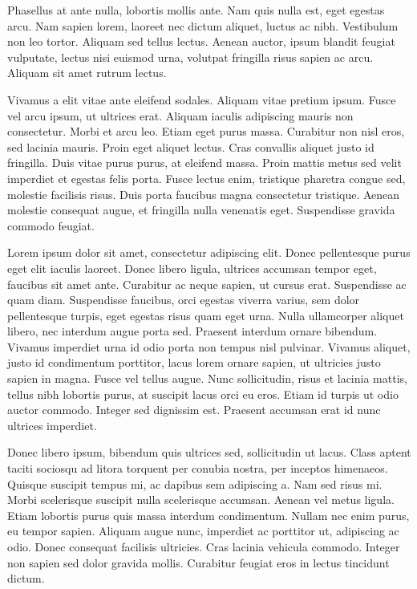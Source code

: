 \begin{multicols}{2}
Phasellus at ante nulla, lobortis mollis ante. Nam quis nulla est, eget egestas arcu. Nam sapien lorem, laoreet nec dictum aliquet, luctus ac nibh. Vestibulum non leo tortor. Aliquam sed tellus lectus. Aenean auctor, ipsum blandit feugiat vulputate, lectus nisi euismod urna, volutpat fringilla risus sapien ac arcu. Aliquam sit amet rutrum lectus.

Vivamus a elit vitae ante eleifend sodales. Aliquam vitae pretium ipsum. Fusce vel arcu ipsum, ut ultrices erat. Aliquam iaculis adipiscing mauris non consectetur. Morbi et arcu leo. Etiam eget purus massa. Curabitur non nisl eros, sed lacinia mauris. Proin eget aliquet lectus. Cras convallis aliquet justo id fringilla. Duis vitae purus purus, at eleifend massa. Proin mattis metus sed velit imperdiet et egestas felis porta. Fusce lectus enim, tristique pharetra congue sed, molestie facilisis risus. Duis porta faucibus magna consectetur tristique. Aenean molestie consequat augue, et fringilla nulla venenatis eget. Suspendisse gravida commodo feugiat.

Lorem ipsum dolor sit amet, consectetur adipiscing elit. Donec pellentesque purus eget elit iaculis laoreet. Donec libero ligula, ultrices accumsan tempor eget, faucibus sit amet ante. Curabitur ac neque sapien, ut cursus erat. Suspendisse ac quam diam. Suspendisse faucibus, orci egestas viverra varius, sem dolor pellentesque turpis, eget egestas risus quam eget urna. Nulla ullamcorper aliquet libero, nec interdum augue porta sed. Praesent interdum ornare bibendum. Vivamus imperdiet urna id odio porta non tempus nisl pulvinar. Vivamus aliquet, justo id condimentum porttitor, lacus lorem ornare sapien, ut ultricies justo sapien in magna. Fusce vel tellus augue. Nunc sollicitudin, risus et lacinia mattis, tellus nibh lobortis purus, at suscipit lacus orci eu eros. Etiam id turpis ut odio auctor commodo. Integer sed dignissim est. Praesent accumsan erat id nunc ultrices imperdiet.

Donec libero ipsum, bibendum quis ultrices sed, sollicitudin ut lacus. Class aptent taciti sociosqu ad litora torquent per conubia nostra, per inceptos himenaeos. Quisque suscipit tempus mi, ac dapibus sem adipiscing a. Nam sed risus mi. Morbi scelerisque suscipit nulla scelerisque accumsan. Aenean vel metus ligula. Etiam lobortis purus quis massa interdum condimentum. Nullam nec enim purus, eu tempor sapien. Aliquam augue nunc, imperdiet ac porttitor ut, adipiscing ac odio. Donec consequat facilisis ultricies. Cras lacinia vehicula commodo. Integer non sapien sed dolor gravida mollis. Curabitur feugiat eros in lectus tincidunt dictum.


\end{multicols}
